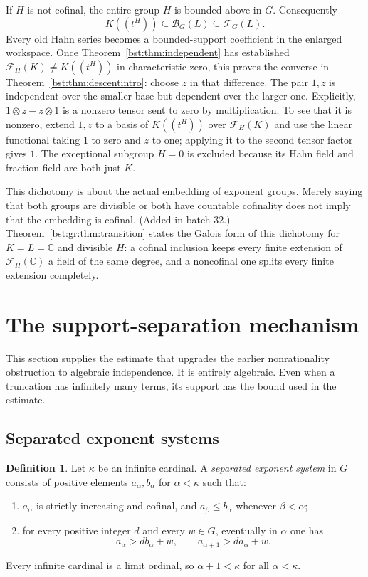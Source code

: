 \documentclass[11pt,letterpaper]{article}
\theoremstyle{definition}
\newtheorem{definition}[theorem]{Definition}
\theoremstyle{remark}
\newcommand{\C}{\mathbb C}
\newcommand{\HH}[2]{#1((t^{#2}))}
\newcommand{\BB}[2]{\mathcal B_{#2}(#1)}
\newcommand{\FF}[2]{\mathcal F_{#2}(#1)}
\begin{document}
If $H$ is not cofinal, the entire group $H$ is bounded above in $G$.
Consequently
\begin{equation}\label{bst:eq:collapse}
 \HH KH\subseteq\BB LG\subseteq\FF LG.
\end{equation}
Every old Hahn series becomes a bounded-support coefficient in the enlarged
workspace. Once Theorem~\ref{bst:thm:independent} has established
$\FF KH\ne\HH KH$ in characteristic zero, this proves the converse in
Theorem~\ref{bst:thm:descentintro}: choose $z$ in that difference. The pair
$1,z$ is independent over the smaller base but dependent over the larger
one. Explicitly, $1\otimes z-z\otimes1$ is a nonzero tensor sent to zero
by multiplication. To see that it is nonzero, extend $1,z$ to a basis of
$\HH KH$ over $\FF KH$ and use the linear functional taking $1$ to zero
and $z$ to one; applying it to the second tensor factor gives $1$.
The exceptional subgroup $H=0$ is excluded because its Hahn field and
fraction field are both just $K$.

This dichotomy is about the actual embedding of exponent groups. Merely
saying that both groups are divisible or both have countable cofinality does
not imply that the embedding is cofinal.
(Added in batch 32.) Theorem~\ref{bst:gr:thm:transition} states the Galois
form of this dichotomy for $K=L=\C$ and divisible $H$: a cofinal inclusion
keeps every finite extension of $\FF{\C}H$ a field of the same degree, and a
noncofinal one splits every finite extension completely.

\section{The support-separation mechanism}\label{bst:sec:gaps}

This section supplies the estimate that upgrades the earlier nonrationality
obstruction to algebraic independence. It is entirely algebraic. Even when
a truncation has infinitely many terms, its support has the bound used in
the estimate.

\subsection{Separated exponent systems}

\begin{definition}\label{bst:def:skeleton}
Let $\kappa$ be an infinite cardinal. A \emph{separated exponent system} in
$G$ consists of positive elements $a_\alpha,b_\alpha$ for $\alpha<\kappa$
such that:
\begin{enumerate}
\item $a_\alpha$ is strictly increasing and cofinal, and
$a_\beta\le b_\alpha$ whenever $\beta<\alpha$;
\item for every positive integer $d$ and every $w\in G$, eventually in
$\alpha$ one has
\begin{equation}\label{bst:eq:gaps}
 a_\alpha>d b_\alpha+w,
 \qquad a_{\alpha+1}>d a_\alpha+w.
\end{equation}
\end{enumerate}
Every infinite cardinal is a limit ordinal, so $\alpha+1<\kappa$ for all
$\alpha<\kappa$.
\end{definition}
\end{document}
